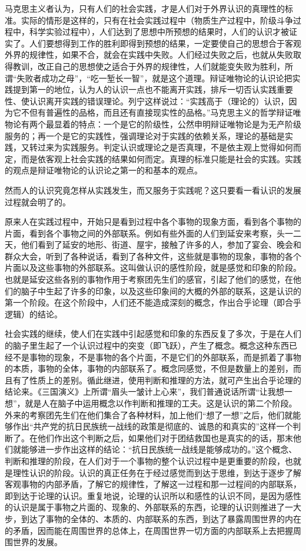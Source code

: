 马克思主义者认为，只有人们的社会实践，才是人们对于外界认识的真理性的标准。实际的情形是这样的，只有在社会实践过程中（物质生产过程中，阶级斗争过程中，科学实验过程中），人们达到了思想中所预想的结果时，人们的认识才被证实了。人们要想得到工作的胜利即得到预想的结果，一定要使自己的思想合于客观外界的规律性，如果不合，就会在实践中失败。人们经过失败之后，也就从失败取得教训，改正自己的思想使之适合于外界的规律性，人们就能变失败为胜利，所谓“失败者成功之母”，“吃一堑长一智”，就是这个道理。辩证唯物论的认识论把实践提到第一的地位，认为人的认识一点也不能离开实践，排斥一切否认实践重要性、使认识离开实践的错误理论。列宁这样说过：“实践高于（理论的）认识，因为它不但有普遍性的品格，而且还有直接现实性的品格。”马克思主义的哲学辩证唯物论有两个最显着的特点：一个是它的阶级性，公然申明辩证唯物论是为无产阶级服务的；再一个是它的实践性，强调理论对于实践的依赖关系，理论的基础是实践，又转过来为实践服务。判定认识或理论之是否真理，不是依主观上觉得如何而定，而是依客观上社会实践的结果如何而定。真理的标准只能是社会的实践。实践的观点是辩证唯物论的认识论之第一的和基本的观点。

然而人的认识究竟怎样从实践发生，而又服务于实践呢？这只要看一看认识的发展过程就会明了的。

原来人在实践过程中，开始只是看到过程中各个事物的现象方面，看到各个事物的片面，看到各个事物之间的外部联系。例如有些外面的人们到延安来考察，头一二天，他们看到了延安的地形、街道、屋宇，接触了许多的人，参加了宴会、晚会和群众大会，听到了各种说话，看到了各种文件，这些就是事物的现象，事物的各个片面以及这些事物的外部联系。这叫做认识的感性阶段，就是感觉和印象的阶段。也就是延安这些各别的事物作用于考察团先生们的感官，引起了他们的感觉，在他们的脑子中生起了许多的印象，以及这些印象间的大概的外部的联系，这是认识的第一个阶段。在这个阶段中，人们还不能造成深刻的概念，作出合乎论理（即合乎逻辑）的结论。

社会实践的继续，使人们在实践中引起感觉和印象的东西反复了多次，于是在人们的脑子里生起了一个认识过程中的突变（即飞跃），产生了概念。概念这种东西已经不是事物的现象，不是事物的各个片面，不是它们的外部联系，而是抓着了事物的本质，事物的全体，事物的内部联系了。概念同感觉，不但是数量上的差别，而且有了性质上的差别。循此继进，使用判断和推理的方法，就可产生出合乎论理的结论来。《三国演义》上所谓“眉头一皱计上心来”，我们普通说话所谓“让我想一想”，就是人在脑子中运用概念以作判断和推理的工夫。这是认识的第二个阶段。外来的考察团先生们在他们集合了各种材料，加上他们“想了一想”之后，他们就能够作出“共产党的抗日民族统一战线的政策是彻底的、诚恳的和真实的”这样一个判断了。在他们作出这个判断之后，如果他们对于团结救国也是真实的的话，那末他们就能够进一步作出这样的结论：“抗日民族统一战线是能够成功的。”这个概念、判断和推理的阶段，在人们对于一个事物的整个认识过程中是更重要的阶段，也就是理性认识的阶段。认识的真正任务在于经过感觉而到达于思维，到达于逐步了解客观事物的内部矛盾，了解它的规律性，了解这一过程和那一过程间的内部联系，即到达于论理的认识。重复地说，论理的认识所以和感性的认识不同，是因为感性的认识是属于事物之片面的、现象的、外部联系的东西，论理的认识则推进了一大步，到达了事物的全体的、本质的、内部联系的东西，到达了暴露周围世界的内在的矛盾，因而能在周围世界的总体上，在周围世界一切方面的内部联系上去把握周围世界的发展。

